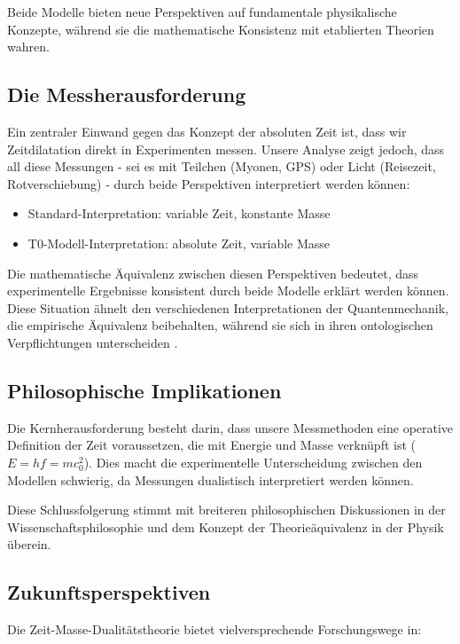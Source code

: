 \documentclass[a4paper,12pt]{article}
\begin{document}
	Beide Modelle bieten neue Perspektiven auf fundamentale physikalische Konzepte, während sie die mathematische Konsistenz mit etablierten Theorien wahren.
	
	\subsection{Die Messherausforderung}
	Ein zentraler Einwand gegen das Konzept der absoluten Zeit ist, dass wir Zeitdilatation direkt in Experimenten messen. Unsere Analyse zeigt jedoch, dass all diese Messungen - sei es mit Teilchen (Myonen, GPS) oder Licht (Reisezeit, Rotverschiebung) - durch beide Perspektiven interpretiert werden können:
	
	\begin{itemize}
		\item Standard-Interpretation: variable Zeit, konstante Masse
		\item T0-Modell-Interpretation: absolute Zeit, variable Masse
	\end{itemize}
	
	Die mathematische Äquivalenz zwischen diesen Perspektiven bedeutet, dass experimentelle Ergebnisse konsistent durch beide Modelle erklärt werden können. Diese Situation ähnelt den verschiedenen Interpretationen der Quantenmechanik, die empirische Äquivalenz beibehalten, während sie sich in ihren ontologischen Verpflichtungen unterscheiden \cite{Schlosshauer2013}.
	
	\subsection{Philosophische Implikationen}
	Die Kernherausforderung besteht darin, dass unsere Messmethoden eine operative Definition der Zeit voraussetzen, die mit Energie und Masse verknüpft ist ($E = h f = m c_0^2$). Dies macht die experimentelle Unterscheidung zwischen den Modellen schwierig, da Messungen dualistisch interpretiert werden können.
	
	Diese Schlussfolgerung stimmt mit breiteren philosophischen Diskussionen in der Wissenschaftsphilosophie \cite{Kuhn1962} und dem Konzept der Theorieäquivalenz in der Physik \cite{Weatherall2019} überein.
	
	\subsection{Zukunftsperspektiven}
	Die Zeit-Masse-Dualitätstheorie bietet vielversprechende Forschungswege in:
	
\end{document}
